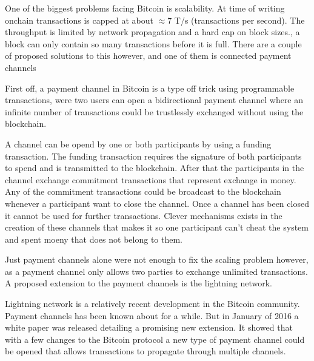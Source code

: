 
One of the biggest problems facing Bitcoin is scalability. At time of writing
onchain transactions is capped at about $\approx 7$ T/s (transactions per second).\cite{scaling}
The throughput is limited by network propagation and a hard cap on block sizes., a block
can only contain so many transactions before it is full. There are a couple of
proposed solutions to this however, and one of them is connected payment channels

First off, a payment channel in Bitcoin is a type off trick using programmable transactions, 
were two users can open a bidirectional payment channel where an infinite number of transactions 
could be trustlessly exchanged without using the blockchain. 

A channel can be opend by one or both participants by using a funding transaction. The funding 
transaction requires the signature of both participants to spend and is transmitted to the blockchain. 
After that the participants in the channel exchange commitment transactions that represent exchange in money.
Any of the commitment transactions could be broadcast to the blockchain whenever a participant 
want to close the channel. Once a channel has been closed it cannot be used for further transactions.
Clever mechanisms exists in the creation of these channels that makes it so one participant 
can't cheat the system and spent moeny that does not belong to them.

Just payment channels alone were not enough to fix the scaling problem however, as a payment channel 
only allows two parties to exchange unlimited transactions. A proposed extension to the 
payment channels is the lightning network.

Lightning network is a relatively recent development in the Bitcoin community.
Payment channels has been known about for a while. But in
January of 2016 a white paper was released detailing a promising new extension.\cite{lightningnetwork_2019}
It showed that with a few changes to the Bitcoin protocol a new type of
payment channel could be opened that allows transactions to propagate through multiple channels.\cite{lightningnetwork_2019}

